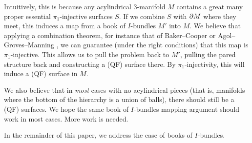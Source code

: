 Intuitively, this is because any acylindrical $3$-manifold $M$ contains a great
many proper essential $\pi_1$-injective surfaces $S$. If we combine $S$ with
$\partial M$ where they meet, this induces a map from a book of $I$-bundles $M'$
into $M$. We believe that applying a combination theorem, for instance that of
Baker--Cooper \cite{BCcombination} or Agol--Groves--Manning
\cite{AGMcombination}, we can guarantee (under the right conditions) that this
map is $\pi_1$-injective. This allows us to pull the problem back to $M'$,
pulling the pared structure back and constructing a (QF) surface there. By
$\pi_1$-injectivity, this will induce a (QF) surface in $M$.

We also believe that in \emph{most} cases with no acylindrical pieces (that is,
manifolds where the bottom of the hierarchy is a union of balls), there should
still be a (QF) surfaces. We hope the same book of $I$-bundles mapping argument
should work in most cases. More work is needed.

In the remainder of this paper, we address the case of books of $I$-bundles.
